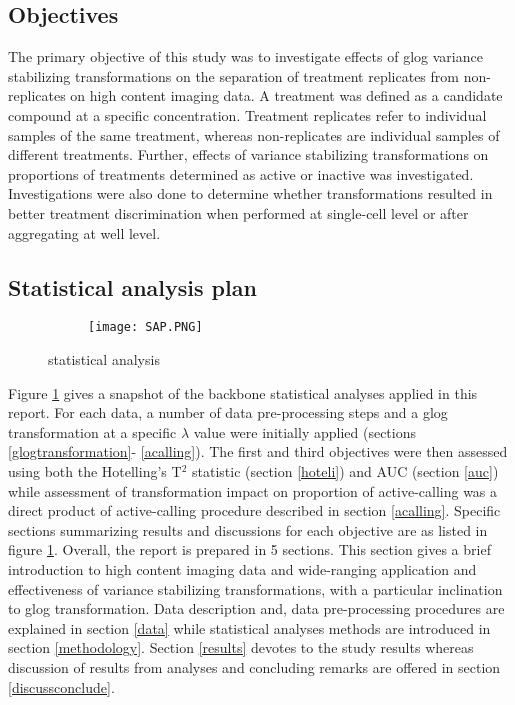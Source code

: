 \documentclass[11pt]{article}
\begin{document}
\subsection{Objectives}\label{objectives}
\par{The primary objective of this study was to investigate effects of glog variance stabilizing transformations on the separation of treatment replicates from non-replicates on high content imaging data. A treatment was defined as a candidate compound at a specific concentration. Treatment replicates refer to individual samples of the same treatment, whereas non-replicates are individual samples of different treatments. Further, effects of variance stabilizing transformations on proportions of treatments determined as active or inactive was investigated. Investigations were also done to determine whether transformations resulted in better treatment discrimination when performed at single-cell level or after aggregating at well level.}
\subsection{Statistical analysis plan}\label{sapintro}
\begin{figure}[ht!] 
\centering
  \begin{subfigure}[b]{0.5\linewidth}
    \centering
    \texttt{[image: SAP.PNG]} 
     \vspace{1ex}
  \end{subfigure}%
  \caption{statistical analysis}
  \label{sapfigure} 
\end{figure}

\par{Figure \ref{sapfigure} gives a snapshot of the backbone statistical analyses applied in this report. For each data, a number of data pre-processing steps and a glog transformation at a specific $\lambda$ value were initially applied (sections \ref{glogtransformation}- \ref{acalling}). The first and third objectives were then assessed using both the Hotelling's T$^2$ statistic (section \ref{hoteli}) and AUC (section \ref{auc}) while assessment of transformation impact on proportion of active-calling was a direct product of active-calling procedure described in section \ref{acalling}. Specific sections summarizing results and discussions for each objective are as listed in figure \ref{sapfigure}. Overall, the report is prepared in 5 sections. This section gives a brief introduction to high content imaging data and wide-ranging application and effectiveness of variance stabilizing transformations, with a particular inclination to glog transformation. Data description and, data pre-processing procedures are explained in section \ref{data} while statistical analyses methods are introduced in section \ref{methodology}. Section \ref{results} devotes to the study results whereas discussion of results from analyses and concluding remarks are offered in section \ref{discussconclude}.}
\end{document}
